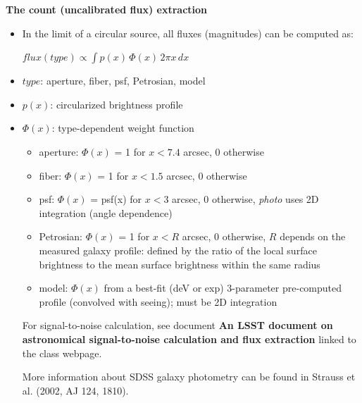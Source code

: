 \documentclass[letterpaper,landscape]{slides}
\begin{document}
\begin{slide}
\begin{center}
\bfseries
{\large {\color{red} The count (uncalibrated flux) extraction}}
\end{center}
\vskip 0.6in

\begin{itemize}
\item {\color{blue} In the limit of a circular source, all fluxes (magnitudes) 
can be computed as:}

         $flux(type) \propto \int p(x) \, \Phi(x) \, 2\pi x \,dx$ 

\item {\color{blue} $type$:} aperture, fiber, psf, Petrosian, model
\item {\color{blue} $p(x)$:} circularized brightness profile
\item {\color{blue} $\Phi(x)$:} type-dependent weight function
\begin{itemize}
   \item {\color{red} aperture:} $\Phi(x)$ = 1 for $x<7.4$ arcsec, 0 otherwise
   \item {\color{red} fiber:} $\Phi(x)$ = 1 for $x<1.5$ arcsec, 0 otherwise
   \item {\color{red} psf:} $\Phi(x)$ = psf(x) for $x<3$ arcsec, 0 otherwise, 
               {\it photo} uses 2D integration (angle dependence)
   \item {\color{red} Petrosian:} $\Phi(x)$ = 1 for $x<R$ arcsec, 0 otherwise,
      $R$ depends on the measured galaxy profile: defined by the 
      ratio of the local surface brightness to the mean surface
      brightness within the same radius  
   \item {\color{red} model:} $\Phi(x)$ from a best-fit (deV or exp) 3-parameter 
     pre-computed profile (convolved with seeing); must be 2D integration
\end{itemize}

For {\color{red} signal-to-noise calculation}, see document {\bf An LSST document on astronomical 
signal-to-noise calculation and flux extraction} linked to the class webpage. 

More information about {\color{red} SDSS galaxy photometry} can be found in Strauss et al. (2002, AJ 124, 1810). 

\end{itemize} 

\end{slide}
 
\end{document}
